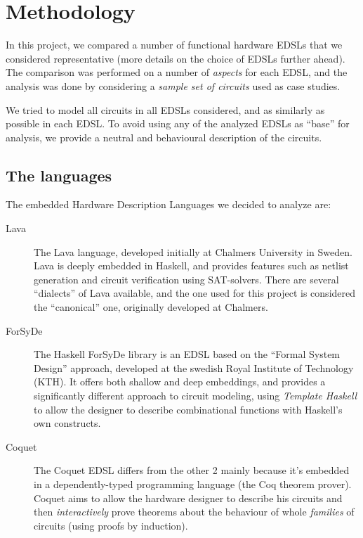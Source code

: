 \section{Methodology}
\label{sec:methods}

    In this project, we compared a number of functional hardware EDSLs that we considered
    representative (more details on the choice of EDSLs further ahead). The comparison was performed
    on a number of \emph{aspects} for each EDSL, and the analysis was done by considering a
    \emph{sample set of circuits} used as case studies.

    We tried to model all circuits in all EDSLs considered, and as similarly as possible in each
    EDSL. To avoid using any of the analyzed EDSLs as ``base'' for analysis, we provide a neutral
    and behavioural description of the circuits.

    \subsection{The languages}
    \label{subsec:languages}
        The embedded Hardware Description Languages we decided to analyze are:

        \begin{description}
            \item[Lava] The Lava\cite{lava1998} language, developed initially at Chalmers University
            in Sweden.  Lava is deeply embedded in Haskell, and provides features such as netlist
            generation and circuit verification using SAT-solvers. There are several ``dialects'' of
            Lava available, and the one used for this project is considered the ``canonical'' one,
            originally developed at Chalmers.

            \item[ForSyDe] The Haskell ForSyDe library is an EDSL based on the ``Formal System
            Design'' approach\cite{forsyde1999}, developed at the swedish Royal Institute of
            Technology (KTH).  It offers both shallow and deep embeddings, and provides a
            significantly different approach to circuit modeling, using \emph{Template Haskell} to
            allow the designer to describe combinational functions with Haskell's own constructs.

            \item[Coquet] The Coquet\cite{coquet2011} EDSL differs from the other 2 mainly because
            it's embedded in a dependently-typed programming language (the Coq theorem prover).
            Coquet aims to allow the hardware designer to describe his circuits and then
            \emph{interactively} prove theorems about the behaviour of whole \emph{families} of
            circuits (using proofs by induction).
        \end{description}



